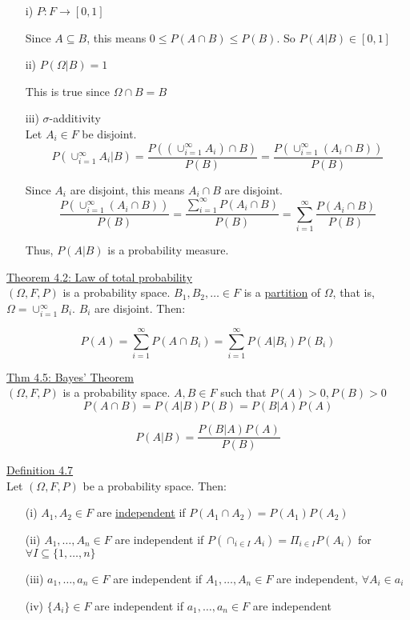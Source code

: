 \documentclass[10pt,letterpaper]{article}
\begin{document}
\begin{enumerate}
\item[i)] $P: F\rightarrow [0,1]$

Since $A\subseteq B$, this means $0\leq P(A\cap B)\leq P(B)$.
So $P(A|B)\in [0,1]$

\item[ii)] $P(\Omega|B)=1$

This is true since $\Omega\cap B=B$

\item[iii)] $\sigma$-additivity\\

Let $A_i\in F$ be disjoint.
$$P(\cup_{i=1}^\infty A_i|B)=\frac{P((\cup_{i=1}^\infty A_i)\cap B)}{P(B)}
=\frac{P(\cup_{i=1}^\infty (A_i\cap B))}{P(B)}$$

Since $A_i$ are disjoint, this means $A_i\cap B$ are disjoint.\\

$$\frac{P(\cup_{i=1}^\infty (A_i\cap B))}{P(B)}=\frac{\sum_{i=1}^\infty P(A_i\cap B)}{P(B)}
=\sum_{i=1}^\infty \frac{P(A_i\cap B)}{P(B)}$$

Thus, $P(A|B)$ is a probability measure.

\end{enumerate}

\underline{Theorem 4.2: Law of total probability}\\

$(\Omega, F, P)$ is a probability space. $B_1, B_2,\dots\in F$ is a \underline{partition} of 
$\Omega$, that is, $\Omega = \cup_{i=1}^\infty B_i$. $B_i$ are disjoint. Then:

$$P(A)=\sum_{i=1}^\infty P(A\cap B_i) =\sum_{i=1}^\infty P(A|B_i)P(B_i)$$

\underline{Thm 4.5: Bayes' Theorem}\\

$(\Omega, F, P)$ is a probability space. $A,B\in F$ such that $P(A)>0,P(B)>0$\\

$$P(A\cap B)=P(A|B)P(B)=P(B|A)P(A)$$

$$P(A|B)=\frac{P(B|A)P(A)}{P(B)}$$

\pagebreak

\underline{Definition 4.7}\\

Let $(\Omega, F, P)$ be a probability space. Then:
\begin{enumerate}

\item[(i)] $A_1, A_2\in F$ are \underline{independent} if $P(A_1\cap A_2)=P(A_1)P(A_2)$
\item[(ii)] $A_1, \dots, A_n\in F$ are independent if $P(\cap_{i\in I}A_i)=\Pi_{i\in I}P(A_i)$ for $\forall I\subseteq\{1,\dots,n\}$
\item[(iii)] $a_1, \dots, a_n\in F$ are independent if $A_1, \dots, A_n\in F$ are independent, $\forall A_i\in a_i$
\item[(iv)] $\{A_i\}\in F$ are independent if $a_1, \dots, a_n\in F$ are independent

\end{enumerate}
\end{document}
